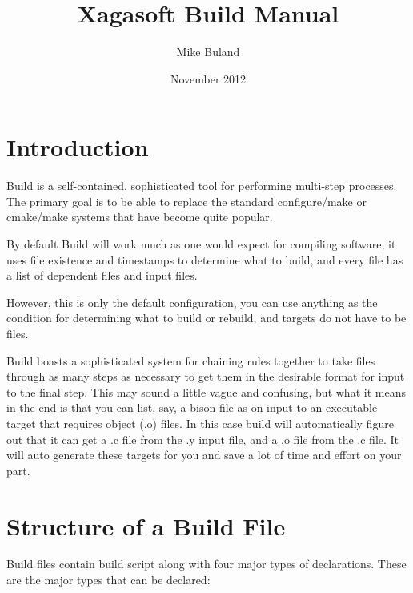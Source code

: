 \documentclass[letterpaper]{book}
\begin{document}
\title{Xagasoft Build Manual}
\author{Mike Buland}
\date{November 2012}
\maketitle

\tableofcontents

\chapter{Introduction}
Build is a self-contained, sophisticated tool for performing multi-step
processes. The primary goal is to be able to replace the standard
configure/make or cmake/make systems that have become quite popular.

By default Build will work much as one would expect for compiling software, it
uses file existence and timestamps to determine what to build, and every file
has a list of dependent files and input files.

However, this is only the default configuration, you can use anything as the
condition for determining what to build or rebuild, and targets do not have to
be files.

Build boasts a sophisticated system for chaining rules together to take files
through as many steps as necessary to get them in the desirable format for input
to the final step.  This may sound a little vague and confusing, but what it
means in the end is that you can list, say, a bison file as on input to an
executable target that requires object (.o) files.  In this case build will
automatically figure out that it can get a .c file from the .y input file, and
a .o file from the .c file.  It will auto generate these targets for you and
save a lot of time and effort on your part.

\chapter{Structure of a Build File}
Build files contain build script along with four major types of declarations.
These are the major types that can be declared:
\end{document}
